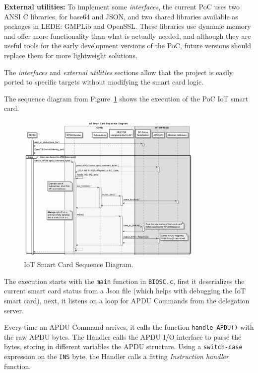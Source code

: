 \hfil

\textbf{External utilities:} To implement some \textit{interfaces}, the current PoC uses two ANSI C libraries, for base64 and JSON, and two shared libraries available as packages in LEDE: GMPLib and OpenSSL. These libraries use dynamic memory and offer more functionality than what is actually needed, and although they are useful tools for the early development versions of the PoC, future versions should replace them for more lightweight solutions.

\hfil

The \textit{interfaces} and \textit{external utilities} sections  allow that the project is easily ported to specific targets without modifying the smart card logic.


\hfil


The sequence diagram from Figure~\ref{fig:sequenceBIOSC} shows the execution of the PoC IoT smart card.



\begin{figure}[bth]
	\centering
	\includegraphics[width=0.8\textwidth]{gfx/sequenceBIOSC}
	\caption{IoT Smart Card Sequence Diagram.}
	\label{fig:sequenceBIOSC}
\end{figure}



The execution starts with the \texttt{main} function in \texttt{BIOSC.c}, first it deserializes the current smart card status from a Json file (which helps with debugging the IoT smart card), next, it listens on a loop for APDU Commands from the delegation server.

Every time an APDU Command arrives, it calls the function \texttt{handle\_APDU()} with the raw APDU bytes. The Handler calls the APDU I/O interface to parse the bytes, storing in different variables the APDU structure. Using a \texttt{switch-case} expression on the \texttt{INS} byte, the Handler calls a fitting \textit{Instruction handler} function.

